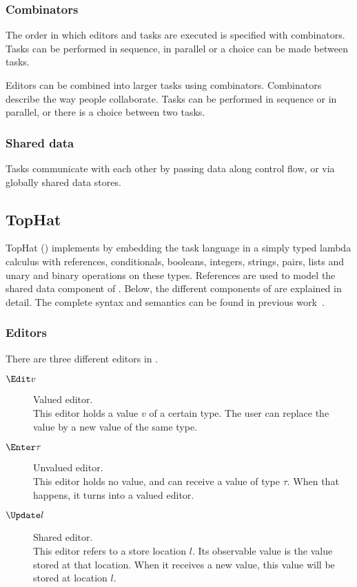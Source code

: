 \subsubsection{Combinators}

  The order in which editors and tasks are executed is specified with combinators. Tasks can be performed in sequence, in parallel or a choice can be made between tasks.


  Editors can be combined into larger tasks using combinators.
  Combinators describe the way people collaborate.
  Tasks can be performed in sequence or in parallel, or there is a choice between two tasks.

\subsubsection{Shared data}

 Tasks communicate with each other by passing data along control flow, or via globally shared data stores.


%
%


\subsection{TopHat}

TopHat (\TOPHAT) implements \TOP by embedding the task language in a simply typed lambda calculus with references, conditionals, booleans, integers, strings, pairs, lists and unary and binary operations on these types.
References are used to model the shared data component of \TOP.
Below, the different components of \TOPHAT are explained in detail.
The complete syntax and semantics can be found in previous work~\cite{Steenvoorden2019}.


\subsubsection{Editors}

There are three different editors in \TOPHAT.
\begin{description}
  \item[$\Edit v$] Valued editor.\\
    This editor holds a value $v$ of a certain type.
    The user can replace the value by a new value of the same type.
  \item[$\Enter \tau$] Unvalued editor.\\
    This editor holds no value, and can receive a value of type $\tau$.
    When that happens, it turns into a valued editor.
  \item[$\Update l$] Shared editor.\\
    This editor refers to a store location $l$.
    Its observable value is the value stored at that location.
    When it receives a new value, this value will be stored at location $l$.
\end{description}


